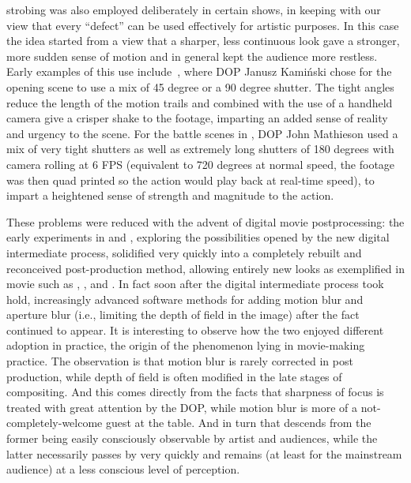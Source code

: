 \Gls{strobing} was also employed deliberately in certain shows, in keeping with our view that
every ``defect'' can be used effectively for artistic purposes. 
In this case the idea started from a view that
a sharper, less continuous look gave a stronger, more sudden sense of motion and in general
kept the audience more restless. 
Early examples of this use include~\cite{savingprivateryan98}, where
\gls{DOP} Janusz Kamiński chose for the opening scene to use a mix of 45 degree or a 90 degree shutter. The tight angles reduce the length of the motion trails and combined with the use of a handheld camera give a crisper shake to the footage, imparting an added sense of reality and urgency to the scene.
For the battle scenes in \cite{gladiator2000}, \gls{DOP} John Mathieson used a mix of very tight
shutters as well as extremely long shutters of 180 degrees with camera rolling at 6 \gls{FPS} 
(equivalent to 720 degrees at normal speed, the footage was then quad printed so the action would play back 
at real-time speed), to impart a heightened sense of strength and magnitude to the action.


These problems were reduced with the advent of digital movie postprocessing:
the early experiments in \cite{pleasantville98} and \cite{whatdreams98}, exploring the possibilities
opened by the new \gls{digital intermediate} process, solidified very quickly into a completely rebuilt
and reconceived post-production method, allowing entirely new looks as exemplified in movie such as
\cite{matrix99}, \cite{brother2000}, \cite{amelie2001} and \cite{moulin2001}. 
In fact soon after the digital intermediate process
took hold, increasingly advanced software methods for adding motion blur and aperture blur 
(i.e., limiting the depth of field in the image) after the fact continued to appear.
It is interesting to observe how the two enjoyed different adoption in practice, the origin
of the phenomenon lying in movie-making practice. The observation is that motion blur is 
rarely corrected in post production, while depth of field is often modified in the late
stages of compositing. And this comes directly from the facts that sharpness of focus is treated 
with great attention by the \gls{DOP}, while  motion blur is more of a 
not-completely-welcome guest at the table. And in turn that descends from the former being
easily consciously observable by artist and audiences, while the latter necessarily 
passes by very quickly and remains (at least for the mainstream audience) at a less conscious
level of perception.


